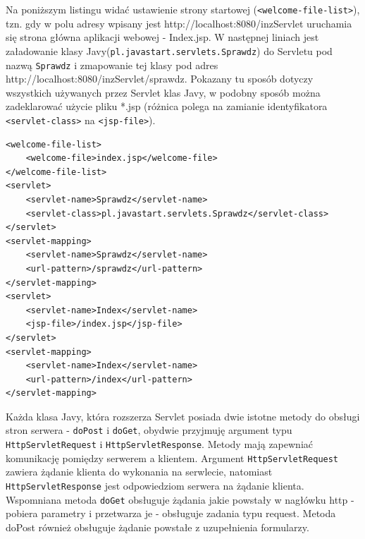 \documentclass[eng,printmode,oneside]{mgr}
\begin{document}
Na poniższym listingu widać ustawienie strony startowej
(\texttt{<welcome-file-list>}), tzn. gdy w polu adresy wpisany jest
http://localhost:8080/inzServlet uruchamia się strona główna aplikacji webowej -
Index.jsp. W następnej liniach jest załadowanie klasy
Javy(\texttt{pl.javastart.servlets.Sprawdz}) do Servletu pod nazwą
\texttt{Sprawdz} i zmapowanie tej klasy pod adres
http://localhost:8080/inzServlet/sprawdz. Pokazany tu sposób dotyczy wszystkich
używanych przez Servlet klas Javy, w podobny sposób można zadeklarować użycie
pliku *.jsp (różnica polega na zamianie identyfikatora \texttt{<servlet-class>}
na \texttt{<jsp-file>}). 

\lstset{language=XML,firstnumber=1,stepnumber=1}
\begin{lstlisting}[caption=Fragment pliku web.xml,label=lst:web.xml]
<welcome-file-list>
	<welcome-file>index.jsp</welcome-file>
</welcome-file-list>
<servlet>
	<servlet-name>Sprawdz</servlet-name>
	<servlet-class>pl.javastart.servlets.Sprawdz</servlet-class>
</servlet>
<servlet-mapping>
	<servlet-name>Sprawdz</servlet-name>
	<url-pattern>/sprawdz</url-pattern>
</servlet-mapping>
<servlet>
	<servlet-name>Index</servlet-name>
	<jsp-file>/index.jsp</jsp-file>
</servlet>
<servlet-mapping>
	<servlet-name>Index</servlet-name>
	<url-pattern>/index</url-pattern>
</servlet-mapping>
\end{lstlisting}

Każda klasa Javy, która rozszerza Servlet posiada dwie istotne metody do obsługi
stron serwera - \texttt{doPost} i \texttt{doGet}, obydwie przyjmuję argument
typu \texttt{HttpServletRequest} i \texttt{HttpServletResponse}.
Metody mają zapewniać komunikację pomiędzy serwerem a klientem. Argument
\texttt{HttpServletRequest} zawiera żądanie klienta do wykonania na serwlecie,
natomiast \texttt{HttpServletResponse} jest odpowiedziom serwera na żądanie
klienta.
Wspomniana metoda \texttt{doGet} obsługuje żądania jakie powstały w nagłówku http - pobiera
parametry i przetwarza je - obsługuje zadania typu request. Metoda doPost
również obsługuje żądanie powstałe z uzupełnienia formularzy. 
\end{document}
